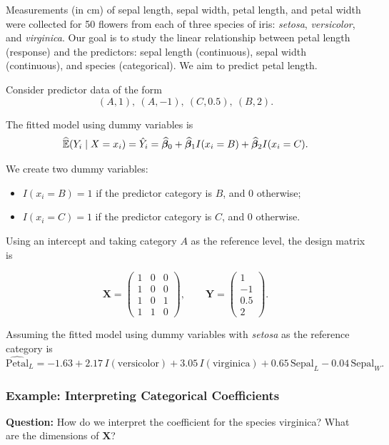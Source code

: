 Measurements (in cm) of sepal length, sepal width, petal length, and petal width were collected for 50 flowers from each of three species of iris: \emph{setosa}, \emph{versicolor}, and \emph{virginica}. Our goal is to study the linear relationship between petal length (response) and the predictors: sepal length (continuous), sepal width (continuous), and species (categorical). We aim to predict petal length.

Consider predictor data of the form
\[
(A, 1), \ (A, -1), \ (C, 0.5), \ (B, 2).
\]

The fitted model using dummy variables is
\[
\widehat{\mathbb{E}}(Y_i \mid X = x_i)
= \hat{Y}_i
= \widehat{\boldsymbol{\beta}}_0
+ \widehat{\boldsymbol{\beta}}_1 I(x_i = B)
+ \widehat{\boldsymbol{\beta}}_2 I(x_i = C).
\]

We create two dummy variables:
\begin{itemize}
    \item $I(x_i = B) = 1$ if the predictor category is $B$, and $0$ otherwise;
    \item $I(x_i = C) = 1$ if the predictor category is $C$, and $0$ otherwise.
\end{itemize}

Using an intercept and taking category $A$ as the reference level, the design matrix is

\[
\mathbf{X}
=
\begin{pmatrix}
1 & 0 & 0 \\
1 & 0 & 0 \\
1 & 0 & 1 \\
1 & 1 & 0
\end{pmatrix},
\qquad
\mathbf{Y}
=
\begin{pmatrix}
1 \\
-1 \\
0.5 \\
2
\end{pmatrix}.
\]

Assuming the fitted model using dummy variables with \emph{setosa} as the reference category is
\[
\widehat{\text{Petal}}_L
= -1.63
+ 2.17\,I(\text{versicolor})
+ 3.05\,I(\text{virginica})
+ 0.65\,\text{Sepal}_L
- 0.04\,\text{Sepal}_W.
\]

\subsubsection*{Example: Interpreting Categorical Coefficients}

\textbf{Question:} How do we interpret the coefficient for the species virginica? What are the dimensions of $\mathbf{X}$?

